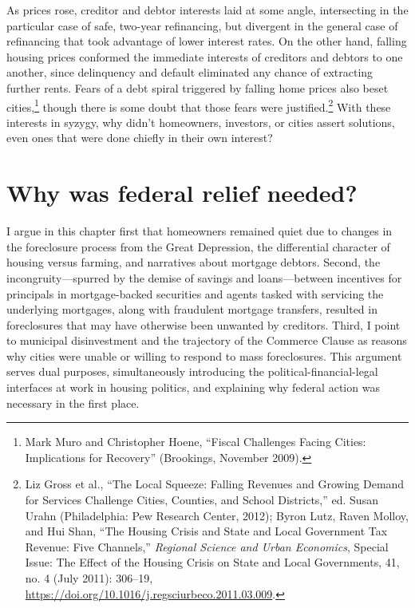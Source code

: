 \documentclass[12pt,oneside]{psthesis}
\begin{document}
As prices rose, creditor and debtor interests laid at some angle, intersecting in the particular case of safe, two-year refinancing, but divergent in the general case of refinancing that took advantage of lower interest rates.
On the other hand, falling housing prices conformed the immediate interests of creditors and debtors to one another, since delinquency and default eliminated any chance of extracting further rents.
Fears of a debt spiral triggered by falling home prices also beset cities,\footnote{Mark Muro and Christopher Hoene, ``Fiscal Challenges Facing Cities: Implications for Recovery'' (Brookings, November 2009).} though there is some doubt that those fears were justified.\footnote{Liz Gross et al., ``The Local Squeeze: Falling Revenues and Growing Demand for Services Challenge Cities, Counties, and School Districts,'' ed. Susan Urahn (Philadelphia: Pew Research Center, 2012); Byron Lutz, Raven Molloy, and Hui Shan, ``The Housing Crisis and State and Local Government Tax Revenue: Five Channels,'' \emph{Regional Science and Urban Economics}, Special Issue: The Effect of the Housing Crisis on State and Local Governments, 41, no. 4 (July 2011): 306--19, \url{https://doi.org/10.1016/j.regsciurbeco.2011.03.009}.}
With these interests in syzygy, why didn't homeowners, investors, or cities assert solutions, even ones that were done chiefly in their own interest?

\hypertarget{why-was-federal-relief-needed}{%
\section{Why was federal relief needed?}\label{why-was-federal-relief-needed}}

I argue in this chapter first that homeowners remained quiet due to changes in the foreclosure process from the Great Depression, the differential character of housing versus farming, and narratives about mortgage debtors.
Second, the incongruity---spurred by the demise of savings and loans---between incentives for principals in mortgage-backed securities and agents tasked with servicing the underlying mortgages, along with fraudulent mortgage transfers, resulted in foreclosures that may have otherwise been unwanted by creditors.
Third, I point to municipal disinvestment and the trajectory of the Commerce Clause as reasons why cities were unable or willing to respond to mass foreclosures.
This argument serves dual purposes, simultaneously introducing the political-financial-legal interfaces at work in housing politics, and explaining why federal action was necessary in the first place.
\end{document}
